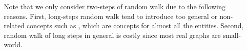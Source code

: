 Note that we only consider two-steps of random walk due to the following reasons.
First, long-steps random walk tend to introduce too general or non-related concepts such as , which are concepts for almost all the entities.
Second, random walk of long steps in general is costly since most real graphs are small-world.

%
%

%
%
%
%
%
%
%
%
%
